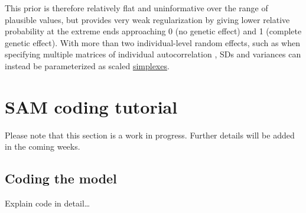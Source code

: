 \documentclass[
]{book}
\begin{document}
This prior is therefore relatively flat and uninformative over the range of plausible values, but provides very weak regularization by giving lower relative probability at the extreme ends approaching 0 (no genetic effect) and 1 (complete genetic effect). With more than two individual-level random effects, such as when specifying multiple matrices of individual autocorrelation \citep{Thomson2018}, SDs and variances can instead be parameterized as scaled \href{https://mc-stan.org/docs/2_19/reference-manual/vector-and-matrix-data-types.html}{simplexes}.

\hypertarget{sam-coding-tutorial}{%
\chapter{SAM coding tutorial}\label{sam-coding-tutorial}}

Please note that this section is a work in progress. Further details will be added in the coming weeks.

\hypertarget{coding-the-model}{%
\section{Coding the model}\label{coding-the-model}}

Explain code in detail\ldots{}
\end{document}
